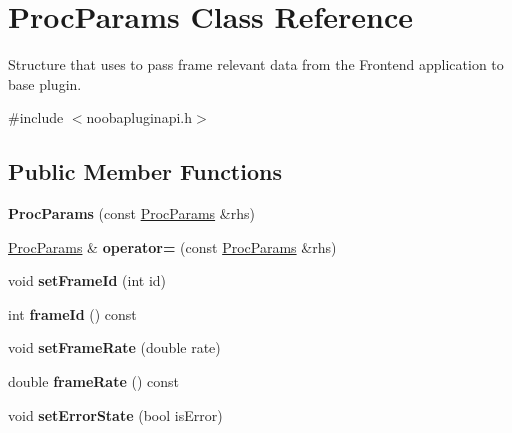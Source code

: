 \hypertarget{class_proc_params}{\section{Proc\-Params Class Reference}
\label{class_proc_params}
}


Structure that uses to pass frame relevant data from the Frontend application to base plugin.  




{\ttfamily \#include $<$noobapluginapi.\-h$>$}

\subsection*{Public Member Functions}
\begin{DoxyCompactItemize}
\item 
\hypertarget{class_proc_params_a3d46f46584fcd75eae4204cf98fd1b31}{{\bfseries Proc\-Params} (const \hyperlink{class_proc_params}{Proc\-Params} \&rhs)}\label{class_proc_params_a3d46f46584fcd75eae4204cf98fd1b31}

\item 
\hypertarget{class_proc_params_a6237e03e1a2b7f521c79bfc448dcd48d}{\hyperlink{class_proc_params}{Proc\-Params} \& {\bfseries operator=} (const \hyperlink{class_proc_params}{Proc\-Params} \&rhs)}\label{class_proc_params_a6237e03e1a2b7f521c79bfc448dcd48d}

\item 
\hypertarget{class_proc_params_acf34cd3883991fbd99fb0843bcd023cd}{void {\bfseries set\-Frame\-Id} (int id)}\label{class_proc_params_acf34cd3883991fbd99fb0843bcd023cd}

\item 
\hypertarget{class_proc_params_a98e4f551be06dec588275aa5cd6e03bf}{int {\bfseries frame\-Id} () const }\label{class_proc_params_a98e4f551be06dec588275aa5cd6e03bf}

\item 
\hypertarget{class_proc_params_aacde091f2256f43d3029945d2cddeec1}{void {\bfseries set\-Frame\-Rate} (double rate)}\label{class_proc_params_aacde091f2256f43d3029945d2cddeec1}

\item 
\hypertarget{class_proc_params_a58c9adacf6f76b562d799945e8de9356}{double {\bfseries frame\-Rate} () const }\label{class_proc_params_a58c9adacf6f76b562d799945e8de9356}

\item 
\hypertarget{class_proc_params_a7a54dbb23763458d0d2563435d2e14a7}{void {\bfseries set\-Error\-State} (bool is\-Error)}\label{class_proc_params_a7a54dbb23763458d0d2563435d2e14a7}


\end{DoxyCompactItemize}
